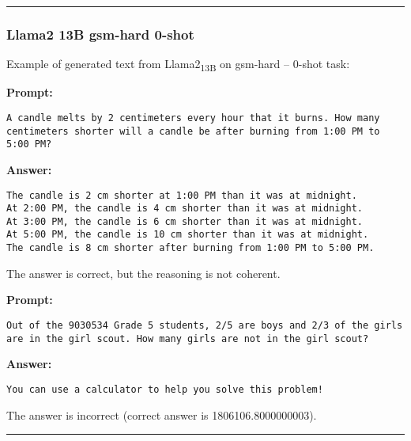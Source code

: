 \noindent\rule{\textwidth}{0.4pt}

\subsubsection*{Llama2 13B gsm-hard 0-shot}
\noindent Example of generated text from Llama2\textsubscript{13B} on gsm-hard -- 0-shot task:
\begin{displayquote}
	\textbf{Prompt:}
	\begin{Verbatim}[fontsize=\small,breaklines]
A candle melts by 2 centimeters every hour that it burns. How many centimeters shorter will a candle be after burning from 1:00 PM to 5:00 PM?
	\end{Verbatim}
	\textbf{Answer:}
	\begin{Verbatim}[fontsize=\small,breaklines]
The candle is 2 cm shorter at 1:00 PM than it was at midnight.
At 2:00 PM, the candle is 4 cm shorter than it was at midnight.
At 3:00 PM, the candle is 6 cm shorter than it was at midnight.
At 5:00 PM, the candle is 10 cm shorter than it was at midnight.
The candle is 8 cm shorter after burning from 1:00 PM to 5:00 PM.
	\end{Verbatim}
\end{displayquote}
The answer is correct, but the reasoning is not coherent.
\begin{displayquote}
	\textbf{Prompt:}
	\begin{Verbatim}[fontsize=\small,breaklines]
Out of the 9030534 Grade 5 students, 2/5 are boys and 2/3 of the girls are in the girl scout. How many girls are not in the girl scout?
	\end{Verbatim}
	\textbf{Answer:}
	\begin{Verbatim}[fontsize=\small,breaklines]
You can use a calculator to help you solve this problem!
	\end{Verbatim}
\end{displayquote}
The answer is incorrect (correct answer is 1806106.8000000003).

\noindent\rule{\textwidth}{0.4pt}

